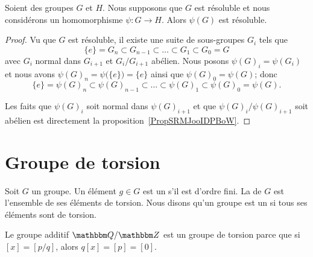 \begin{proposition} \label{PropBNEZooJMDFIB}
    Soient des groupes \( G\) et \( H\). Nous supposons que \( G\) est résoluble et nous considérons un homomorphisme \( \psi\colon G\to H\). Alors \( \psi(G)\) est résoluble.
\end{proposition}

\begin{proof}
    Vu que \( G\) est résoluble, il existe une suite de sous-groupes \( G_i\) tels que
    \begin{equation}
        \{ e \}=G_n\subset G_{n-1}\subset\ldots\subset G_1\subset G_0=G
    \end{equation}
    avec \( G_i\) normal dans \( G_{i+1}\) et \( G_i/G_{i+1}\) abélien. Nous posons \( \psi(G)_i=\psi(G_i)\) et nous avons \( \psi(G)_n=\psi\big( \{ e \} \big)=\{ e \}\) ainsi que \( \psi(G)_0=\psi(G)\); donc
    \begin{equation}
        \{ e \}=\psi(G)_n\subset \psi(G)_{n-1}\subset\ldots\subset \psi(G)_1\subset \psi(G)_0=\psi(G).
    \end{equation}

    Les faits que \( \psi(G)_i\) soit normal dans \( \psi(G)_{i+1}\) et que \( \psi(G)_i/\psi(G)_{i+1}\) soit abélien est directement la proposition~\ref{PropSRMJooIDPBoW}.

\end{proof}

\section{Groupe de torsion}

Soit \( G\) un groupe. Un élément \( g\in G\) est un  s'il est d'ordre fini. La  de \( G\) est l'ensemble de ses éléments de torsion. Nous disons qu'un groupe est un  si tous ses éléments sont de torsion.

\begin{example}
    Le groupe additif \( \eQ/\eZ\) est un groupe de torsion parce que si \( [x]=[p/q]\), alors \( q[x]=[p]=[0]\).
\end{example}

